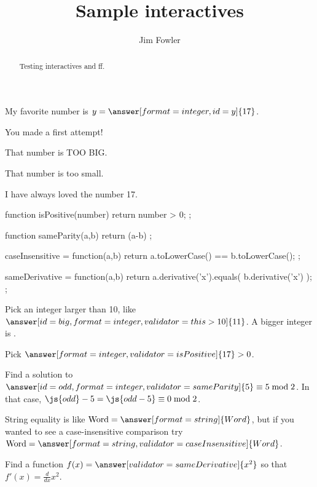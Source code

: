 \documentclass{ximera}
\title{Sample interactives}
\author{Jim Fowler}
\begin{document}
\begin{abstract}
Testing interactives and ff.
\end{abstract}
\maketitle

\begin{problem}
  My favorite number is $y = \answer[format=integer,id=y]{17}$.

  \begin{feedback}[attempt]
    You made a first attempt!
  \end{feedback}





  \begin{feedback}[y>17]
    That number is TOO BIG.
  \end{feedback}

  \begin{feedback}[y<17]
    That number is too small.
  \end{feedback}

  \begin{feedback}[correct]
    I have always loved the number 17.
  \end{feedback}
\end{problem}

\begin{javascript}
  function isPositive(number) {
    return number > 0;
  };

  function sameParity(a,b) {
    return (a-b)%
  };

  caseInsensitive = function(a,b) {
    return a.toLowerCase() == b.toLowerCase();
  };

  sameDerivative = function(a,b) {
    return a.derivative('x').equals( b.derivative('x') );
  };
\end{javascript}

\begin{problem}
  Pick an integer larger than 10, like $\answer[id=big,format=integer,validator=this>10]{11}$.  A bigger integer is .

  Pick $\answer[format=integer,validator=isPositive]{17} > 0$.

  Find a solution to $\answer[id=odd,format=integer,validator=sameParity]{5} \equiv 5 \bmod 2$.  In that case, $\js{odd} - 5 = \js{odd-5} \equiv 0 \bmod 2$.

  String equality is like $\mbox{Word} = \answer[format=string]{Word}$, but if you wanted to see a case-insensitive comparison try $\mbox{Word} = \answer[format=string,validator=caseInsensitive]{Word}$.

  Find a function $f(x) = \answer[validator=sameDerivative]{x^2}$ so that $f'(x) = \frac{d}{dx} x^2$.
\end{problem}
\end{document}
